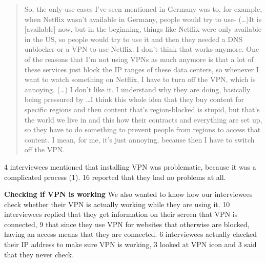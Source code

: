 \begin{quote}So, the only use cases I've seen mentioned in Germany was to, for example, when Netflix wasn't available in Germany, people would try to use-
(\dots)It is [available] now, but in the beginning, things like Netflix were only available in the US, so people would try to use it and then they needed a DNS unblocker or a VPN to use Netflix. I don't think that works anymore. One of the reasons that I'm not using VPNs as much anymore is that a lot of these services just block the IP ranges of these data centers, so whenever I want to watch something on Netflix, I have to turn off the VPN, which is annoying. (\dots) I don't like it. I understand why they are doing, basically being pressured by \dots I think this whole idea that they buy content for specific regions and then content that's region-blocked is stupid, but that's the world we live in and this how their contracts and everything are set up, so they have to do something to prevent people from regions to access that content. I mean, for me, it's just annoying, because then I have to switch off the VPN. \end{quote}


4 interviewees mentioned that installing VPN was problematic, because it was a complicated process (1). 16 reported that they had no problems at all. 

\textbf{Checking if VPN is working}
We also wanted to know how our interviewees check whether their VPN is actually working while they are using it. 10 interviewees replied that they get information on their screen that VPN is connected, 9 that since they use VPN for websites that otherwise are blocked, having an access means that they are connected. 6 interviewees actually checked their IP address to make sure VPN is working, 3 looked at VPN icon and 3 said that they never check. 



